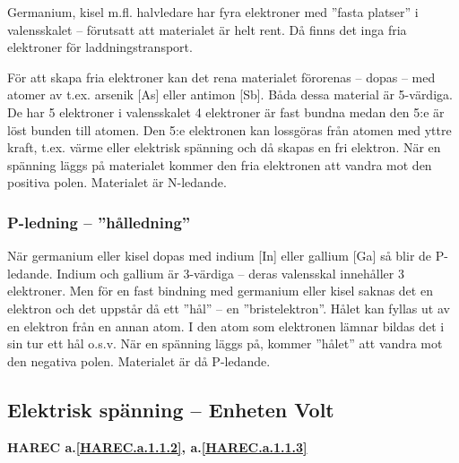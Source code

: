 Germanium, kisel m.fl. halvledare har fyra elektroner med ''fasta platser'' i
valensskalet -- förutsatt att materialet är helt rent. Då finns det inga fria
elektroner för laddningstransport.

För att skapa fria elektroner kan det rena materialet förorenas -- dopas -- med
atomer av t.ex. arsenik [As] eller antimon [Sb]. Båda dessa material är
5-värdiga. De har 5 elektroner i valensskalet 4 elektroner är fast bundna medan
den 5:e är löst bunden till atomen. Den 5:e elektronen kan lossgöras från
atomen med yttre kraft, t.ex. värme eller elektrisk spänning och då skapas en
fri elektron. När en spänning läggs på materialet kommer den fria elektronen
att vandra mot den positiva polen. Materialet är N-ledande.

\subsubsection{P-ledning -- ''hålledning''}
När germanium eller kisel dopas med indium [In] eller gallium [Ga] så blir de
P-ledande. Indium och gallium är 3-värdiga -- deras valensskal innehåller 3
elektroner. Men för en fast bindning med germanium eller kisel saknas det en
elektron och det uppstår då ett ''hål'' -- en ''bristelektron''. Hålet kan fyllas ut
av en elektron från en annan atom. I den atom som elektronen lämnar bildas det
i sin tur ett hål o.s.v. När en spänning läggs på, kommer ''hålet'' att vandra
mot den negativa polen. Materialet är då P-ledande.

\subsection{Elektrisk spänning -- Enheten Volt}
\textbf{HAREC a.\ref{HAREC.a.1.1.2}\label{myHAREC.a.1.1.2b}, a.\ref{HAREC.a.1.1.3}\label{myHAREC.a.1.1.3b}}


